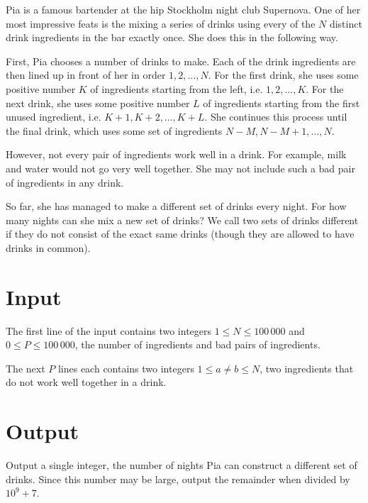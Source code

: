 Pia is a famous bartender at the hip Stockholm night club Supernova.
One of her most impressive feats is the mixing a series of drinks using every of the $N$ distinct drink ingredients in the bar exactly once.
She does this in the following way.

First, Pia chooses a number of drinks to make.
Each of the drink ingredients are then lined up in front of her in order $1, 2, \dots, N$.
For the first drink, she uses some positive number $K$ of ingredients starting from the left, i.e. $1, 2, ..., K$.
For the next drink, she uses some positive number $L$ of ingredients starting from the first unused ingredient, i.e. $K + 1, K + 2, \dots, K + L$.
She continues this process until the final drink, which uses some set of ingredients $N - M, N - M + 1, \dots, N$.

However, not every pair of ingredients work well in a drink.
For example, milk and water would not go very well together.
She may not include such a bad pair of ingredients in any drink.

So far, she has managed to make a different set of drinks every night.
For how many nights can she mix a new set of drinks?
We call two sets of drinks different if they do not consist of the exact same drinks (though they are allowed to have drinks in common).

\section*{Input}
The first line of the input contains two integers $1 \le N \le 100\,000$ and $0 \le P \le 100\,000$, the number of ingredients and bad pairs of ingredients.

The next $P$ lines each contains two integers $1 \le a \not= b \le N$, two ingredients that do not work well together in a drink.

\section*{Output}
Output a single integer, the number of nights Pia can construct a different set of drinks.
Since this number may be large, output the remainder when divided by $10^9 + 7$.
